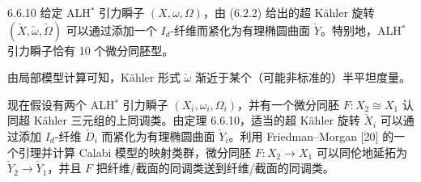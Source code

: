 \begin{theorem}{6.6.10}
给定 ALH$^*$ 引力瞬子 $(X,\omega,\Omega)$，由 (6.2.2) 给出的超 Kähler 旋转 $(\check X,\check\omega,\check\Omega)$ 可以通过添加一个 $I_d$-纤维而紧化为有理椭圆曲面 $\check Y$。特别地，ALH$^*$ 引力瞬子恰有 10 个微分同胚型。
\end{theorem}

由局部模型计算可知，Kähler 形式 $\check\omega$ 渐近于某个（可能非标准的）半平坦度量。

现在假设有两个 ALH$^*$ 引力瞬子 $(X_i,\omega_i,\Omega_i)$，并有一个微分同胚 $F:X_2\cong X_1$ 认同超 Kähler 三元组的上同调类。由定理 6.6.10，适当的超 Kähler 旋转 $\check X_i$ 可以通过添加 $I_d$-纤维 $\check D_i$ 而紧化为有理椭圆曲面 $\check Y_i$。利用 Friedman--Morgan [20] 的一个引理并计算 Calabi 模型的映射类群，微分同胚 $F:X_2\to X_1$ 可以同伦地延拓为 $\check Y_2\to\check Y_1$，并且 $F$ 把纤维/截面的同调类送到纤维/截面的同调类。
